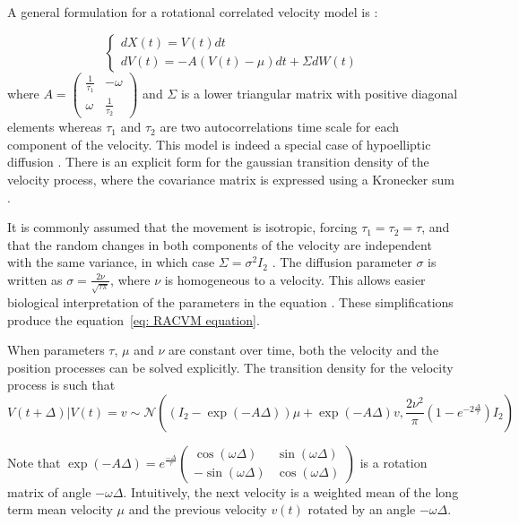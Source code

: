 \documentclass[11pt]{article}
\newcommand {\1}{\mathbb{1}}
\begin{document}

A general formulation for a rotational correlated velocity model is \cite{albertsen_generalizing_2018}:

\begin{equation} \left\{
	\begin{array}{l}
		dX(t)=V(t) dt \\
		dV(t)=-A(V(t)-\mu)dt+\Sigma dW(t) 
	
	\end{array}
	\right.
	\label{eq: general RACVM equation}
\end{equation}
where $A=\begin{pmatrix} 
	\frac{1}{\tau_1} & -\omega \\
	\omega & \frac{1}{\tau_2}
\end{pmatrix}$ and $\Sigma$ is a lower triangular matrix with positive diagonal elements whereas $\tau_1$ and $\tau_2$ are two autocorrelations time scale for each component of the velocity. This model is indeed a special case of hypoelliptic diffusion \cite{ditlevsen_hypoelliptic_2019}.
There is an explicit form for the gaussian transition density of the velocity process, where the covariance matrix is expressed using a Kronecker sum \cite{albertsen_generalizing_2018}.

It is commonly assumed that the movement is isotropic, forcing $\tau_1=\tau_2=\tau$, and that the random changes in both components of the velocity are independent with the same variance, in which case $\Sigma=\sigma^2 I_2$ \cite{johnson_continuoustime_2008}.
The diffusion parameter $\sigma$ is written as $\sigma=\frac{2\nu}{\sqrt{\tau \pi}}$, where $\nu$ is homogeneous to a velocity. This allows easier biological interpretation  of the parameters in the equation \cite{gurarie_correlated_2017}. These simplifications produce the equation~\ref{eq: RACVM equation}.

When parameters $\tau$, $\mu$ and $\nu$ are constant over time, both the velocity and the position processes can be solved explicitly.
The transition density for the velocity process is such that 
\begin{equation}V(t+\Delta) \vert V(t)=v \sim \mathcal{N}\left( (I_2-\exp(-A\Delta))\mu + \exp(-A\Delta)v, \frac{2\nu^2}{\pi}(1-e^{-2\frac{\Delta}{\tau}}) I_2 \right) 
\end{equation}


Note that $\exp(-A\Delta)=e^{\frac{-\Delta}{\tau}} \begin{pmatrix} \cos(\omega \Delta) & \sin(\omega \Delta) \\ -\sin(\omega \Delta) & \cos(\omega \Delta) \end{pmatrix}$ is a rotation matrix of angle $-\omega \Delta$.
Intuitively, the next velocity is a weighted mean of the long term mean velocity $\mu$ and the previous velocity $v(t)$ rotated by an angle $-\omega \Delta$.
\end{document}
